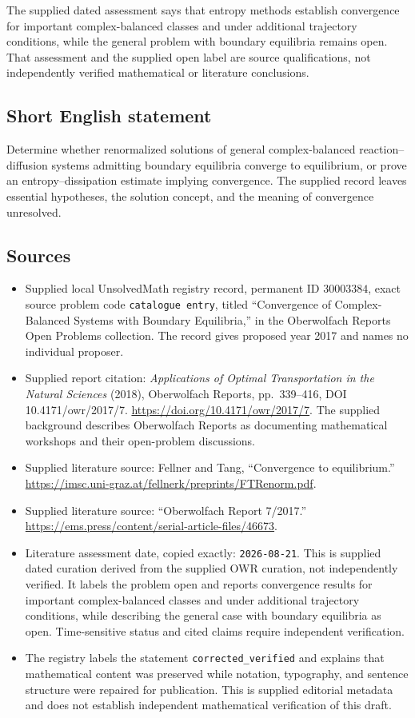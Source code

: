 \documentclass[11pt]{article}
\begin{document}
The supplied dated assessment says that entropy methods establish convergence for important complex-balanced classes and under additional trajectory conditions, while the general problem with boundary equilibria remains open. That assessment and the supplied open label are source qualifications, not independently verified mathematical or literature conclusions.
\subsection{Short English statement}
Determine whether renormalized solutions of general complex-balanced reaction--diffusion systems admitting boundary equilibria converge to equilibrium, or prove an entropy--dissipation estimate implying convergence. The supplied record leaves essential hypotheses, the solution concept, and the meaning of convergence unresolved.
\subsection{Sources}
\begin{itemize}
\item Supplied local UnsolvedMath registry record, permanent ID \(30003384\), exact source problem code \texttt{catalogue entry}, titled ``Convergence of Complex-Balanced Systems with Boundary Equilibria,'' in the Oberwolfach Reports Open Problems collection. The record gives proposed year 2017 and names no individual proposer.
\item Supplied report citation: \emph{Applications of Optimal Transportation in the Natural Sciences} (2018), Oberwolfach Reports, pp.\ 339--416, DOI 10.4171/owr/2017/7. \url{https://doi.org/10.4171/owr/2017/7}. The supplied background describes Oberwolfach Reports as documenting mathematical workshops and their open-problem discussions.
\item Supplied literature source: Fellner and Tang, ``Convergence to equilibrium.'' \url{https://imsc.uni-graz.at/fellnerk/preprints/FTRenorm.pdf}.
\item Supplied literature source: ``Oberwolfach Report 7/2017.'' \url{https://ems.press/content/serial-article-files/46673}.
\item Literature assessment date, copied exactly: \texttt{2026-08-21}. This is supplied dated curation derived from the supplied OWR curation, not independently verified. It labels the problem open and reports convergence results for important complex-balanced classes and under additional trajectory conditions, while describing the general case with boundary equilibria as open. Time-sensitive status and cited claims require independent verification.
\item The registry labels the statement \texttt{corrected\_verified} and explains that mathematical content was preserved while notation, typography, and sentence structure were repaired for publication. This is supplied editorial metadata and does not establish independent mathematical verification of this draft.
\end{itemize}
\end{document}
